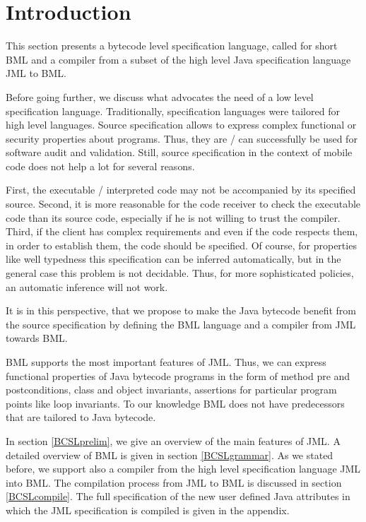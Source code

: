 
%

\newcommand{\code}{\textit{code}}
\newcommand{\indexComp}{\textit{index}}





\section{Introduction} \label{bcsl}
This section presents a bytecode level specification language, called for short BML and a compiler from a
 subset of the high level Java specification language JML to BML. 


 Before going further, we discuss what advocates the need of a low level specification language.
Traditionally, specification languages were tailored for high level languages.  
Source  specification allows to express complex functional or security properties about programs.
Thus, they are / can successfully be used 
for software audit and validation. Still, source specification in the context of mobile code does not help a lot for several reasons.


First, the executable / interpreted code  may not be accompanied by its specified  source. Second, it is more reasonable for the 
code receiver to check the executable code than its source code, especially if he is not willing to trust the compiler. 
Third, if the client has complex requirements and even if the code respects them, in order to establish them, 
the code should be specified. Of course, for properties like well typedness this specification can be inferred automatically,
but in the general case this problem is not decidable. 
Thus, for more sophisticated policies, an automatic inference will not work.

 It is in this perspective, that we propose to make the Java
bytecode benefit from the source specification by defining the BML language and a compiler from JML towards BML.    

 BML supports the most important features of JML. Thus, we can express functional properties of Java
 bytecode programs in the form of method pre and postconditions, class and object invariants, assertions
 for particular program points like loop invariants. To our knowledge BML does not have predecessors that are tailored 
 to Java bytecode.  

 In section \ref{BCSLprelim}, we give an overview of the main features of JML. A detailed overview of BML is given in section \ref{BCSLgrammar}.  
  As we stated before, we support also a compiler from the high level specification language JML into BML. The 
 compilation process from JML to BML is discussed in section  \ref{BCSLcompile}.
 The full specification of the new user defined Java attributes in which the JML specification is compiled is given in the appendix.




